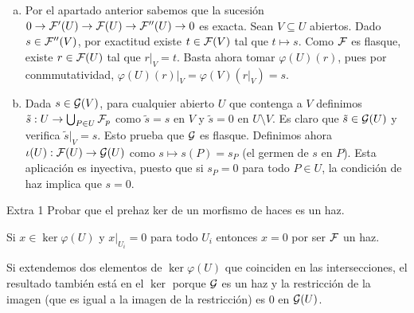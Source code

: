 \documentclass[twoside]{article}
\begin{document}
\begin{solucion}
\begin{enumerate}[(a)]
Para $s\in\calF''(U)$, consideremos ahora el conjunto de tuplas $(V,t)$ donde $t\in\calF(V)$ tal que $\varphi(V)(t)=s|_V$, y definimos un orden en este conjunto como $(V,t)\leq (V',t')$ si $V\subseteq V'$ y $t'|_V=t$. Este conjunto es no vacío porque el par $(\emptyset, 0)$ está en él. Cualquier cadena creciente $\{(V_i,t_i)\}$ tiene una cota superior, pues podemos construir $V=\bigcup_i V_i$ y por los axiomas de haz existe $t\in\calF(V)$ con $t|_{V_i}=t_i$. Por el lema de Zorn existe un elemento maximal en el conjunto de tuplas, $(V_m,t_m)$. Basta probar entonces que $V_m=U$. 

Supongamos que $x\in U\setminus V_m$. Por el ejercicio 1.3, existen un entorno $V_x$ de $x$ y $t_x\in\calF(V_x)$ con $\varphi(V_x)(t_x)=s|_{V_x}$. Usamos el lema aplicado a $V_m$ y $V_x$, de lo que deducimos que existe una sección $t\in\calF(V_m\cup V_x)$ tal que $\varphi(V_x)(t|_{V_x})=\varphi(V_x)(t_x)=s|_{V_x}$. Por maximalidad, debe ser $V_m=V_m\cup V_x$, lo cual contradice el hecho de que $x\notin V_m$. 

\item Por el apartado anterior sabemos que la sucesión $0\to\mathcal{F}'(U)\to\mathcal{F}(U)\to\mathcal{F}''(U)\to 0$ es exacta. Sean $V\subseteq U$ abiertos. Dado $s\in\mathcal{F}''(V)$, por exactitud existe $t\in\calF(V)$ tal que $t\mapsto s$. Como $\mathcal{F}$ es flasque, existe $r\in\mathcal{F}(U)$ tal que $r|_V=t$. Basta ahora tomar $\varphi(U)(r)$, pues por conmmutatividad, $\varphi(U)(r)|_V=\varphi(V)(r|_V)=s$. 

\item Dada $s\in\mathcal{G}(V)$, para cualquier abierto $U$ que contenga a $V$ definimos $\tilde{s}:U\to \bigcup_{P\in U}\mathcal{F}_p$ como $\tilde{s}=s$ en $V$ y $\tilde{s}=0$ en $U\setminus V$. Es claro que $\tilde{s}\in\mathcal{G}(U)$ y verifica $\tilde{s}|_V=s$. Esto prueba que $\mathcal{G}$ es flasque. Definimos ahora $\iota(U):\mathcal{F}(U)\to\mathcal{G}(U)$ como $s\mapsto s(P)=s_P$ (el germen de $s$ en $P$). Esta aplicación es inyectiva, puesto que si $s_P=0$ para todo $P\in U$, la condición de haz implica que $s=0$. 
\end{enumerate}

\end{solucion}
%
\newpage
%
\begin{ejercicio}{Extra 1}
Probar que el prehaz ker de un morfismo de haces es un haz.
\end{ejercicio}
\begin{solucion}
Si $x\in\ker\varphi(U)$ y $x|_{U_i}=0$ para todo $U_i$ entonces $x=0$ por ser $\mathcal{F}$ un haz.

Si extendemos dos elementos de $\ker\varphi(U)$ que coinciden en las intersecciones, el resultado también está en el $\ker$ porque $\mathcal{G}$ es un haz y la restricción de la imagen (que es igual a la imagen de la restricción) es 0 en $\mathcal{G}(U)$. 




\end{solucion}
\end{document}
